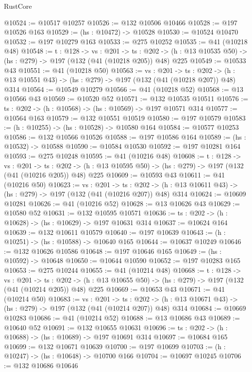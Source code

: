 \begin{lexlean}{RustCore}
\begin{coremodule}
@10524 := @10517 @10257
@10526 := @132 @10506 @10466
@10528 := @197 @10526 @163
@10529 := (hs : @10472) -> @10528
@10530 := @10524 @10470
@10532 := @197 @10279 @163
@10533 := @275 @10252
@10535 := @41 (@10218 @48)
@10548 := {t : @128} ->
  {vs : @201} ->
  {ts : @202} -> (h : @13 @10535 @50) -> (hs : @279) -> @197 (@132 (@41 (@10218 @205)) @48) @225
@10549 := @10533 @43
@10551 := @41 (@10218 @50)
@10563 := {vs : @201} ->
  {ts : @202} -> (h : @13 @10551 @43) -> (hs : @279) -> @197 (@132 (@41 (@10218 @207)) @48) @314
@10564 := @10549 @10279
@10566 := @41 (@10218 @52)
@10568 := @13 @10566 @43
@10569 := @10520 @52
@10571 := @132 @10535 @10511
@10576 := {ts : @202} -> (h : @10568) -> (hs : @10569) -> @197 @10571 @314
@10577 := @10564 @163
@10579 := @132 @10551 @10519
@10580 := @197 @10579
@10583 := (h : @10255) -> (hs : @10528) -> @10580 @164
@10584 := @10577 @10253
@10586 := @132 @10566 @10526
@10588 := @197 @10586 @164
@10589 := (hs : @10532) -> @10588
@10590 := @10584 @10530
@10592 := @197 @10281 @164
@10593 := @275 @10248
@10595 := @41 (@10216 @48)
@10608 := {t : @128} ->
  {vs : @201} ->
  {ts : @202} -> (h : @13 @10595 @50) -> (hs : @279) -> @197 (@132 (@41 (@10216 @205)) @48) @225
@10609 := @10593 @43
@10611 := @41 (@10216 @50)
@10623 := {vs : @201} ->
  {ts : @202} -> (h : @13 @10611 @43) -> (hs : @279) -> @197 (@132 (@41 (@10216 @207)) @48) @314
@10624 := @10609 @10281
@10626 := @41 (@10216 @52)
@10628 := @13 @10626 @43
@10629 := @10580 @52
@10631 := @132 @10595 @10571
@10636 := {ts : @202} -> (h : @10628) -> (hs : @10629) -> @197 @10631 @314
@10637 := @10624 @164
@10639 := @132 @10611 @10579
@10640 := @197 @10639
@10643 := (h : @10251) -> (hs : @10588) -> @10640 @165
@10644 := @10637 @10249
@10646 := @132 @10626 @10586
@10648 := @197 @10646 @165
@10649 := (hs : @10592) -> @10648
@10650 := @10644 @10590
@10652 := @197 @10283 @165
@10653 := @275 @10244
@10655 := @41 (@10214 @48)
@10668 := {t : @128} ->
  {vs : @201} ->
  {ts : @202} -> (h : @13 @10655 @50) -> (hs : @279) -> @197 (@132 (@41 (@10214 @205)) @48) @225
@10669 := @10653 @43
@10671 := @41 (@10214 @50)
@10683 := {vs : @201} ->
  {ts : @202} -> (h : @13 @10671 @43) -> (hs : @279) -> @197 (@132 (@41 (@10214 @207)) @48) @314
@10684 := @10669 @10283
@10686 := @41 (@10214 @52)
@10688 := @13 @10686 @43
@10689 := @10640 @52
@10691 := @132 @10655 @10631
@10696 := {ts : @202} -> (h : @10688) -> (hs : @10689) -> @197 @10691 @314
@10697 := @10684 @165
@10699 := @132 @10671 @10639
@10700 := @197 @10699
@10703 := (h : @10247) -> (hs : @10648) -> @10700 @166
@10704 := @10697 @10245
@10706 := @132 @10686 @10646

\end{coremodule}
\end{lexlean}
